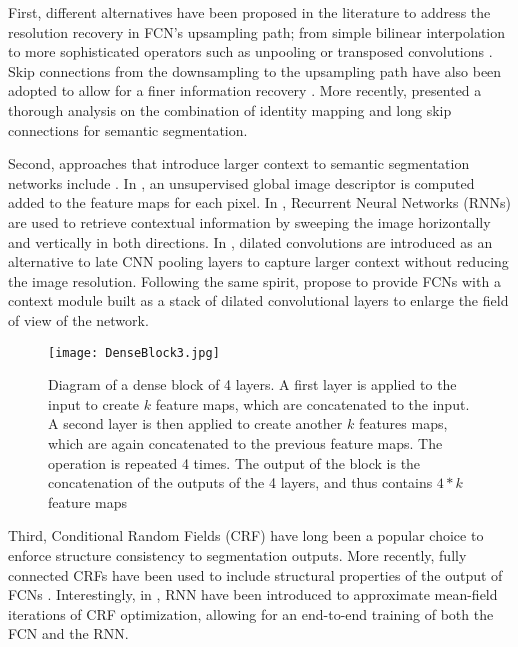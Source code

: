 \documentclass[10pt,twocolumn,letterpaper]{article}
\begin{document}
First, different alternatives have been proposed in the literature to address the resolution recovery in FCN's upsampling path; from simple bilinear interpolation \cite{Gatta14-deepvision, long2015fully, SegNet2015} to more sophisticated operators such as unpooling \cite{SegNet2015, noh2015learning} or transposed convolutions \cite{long2015fully}. Skip connections from the downsampling to the upsampling path have also been adopted to allow for a finer information recovery \cite{ronneberger2015u}. More recently, \cite{DrozdzalVCKP16} presented a thorough analysis on the combination of identity mapping \cite{HeZRS15} and long skip connections \cite{ronneberger2015u} for semantic segmentation.

Second, approaches that introduce larger context to semantic segmentation networks include \cite{Gatta14-deepvision, VisinKCBMC15, chen14semantic, YuKoltun2016}. In \cite{Gatta14-deepvision}, an unsupervised global image descriptor is computed added to the feature maps for each pixel. In \cite{VisinKCBMC15}, Recurrent Neural Networks (RNNs) are used to retrieve contextual information by sweeping the image horizontally and vertically in both directions. In \cite{chen14semantic}, dilated convolutions are introduced as an alternative to late CNN pooling layers to capture larger context without reducing the image resolution. Following the same spirit, \cite{YuKoltun2016} propose to provide FCNs with a context module built as a stack of dilated convolutional layers to enlarge the field of view of the network. 

\begin{figure}[t!]
\centering
  \texttt{[image: DenseBlock3.jpg]}
  \caption{\label{fig:DenseBlock}Diagram of a dense block of 4 layers. A first layer is applied to the input to create $k$ feature maps, which are concatenated to the input. A second layer is then applied to create another $k$ features maps, which are again concatenated to the previous feature maps. The operation is repeated 4 times. The output of the block is the concatenation of the outputs of the 4 layers, and thus contains $4*k$ feature maps}
\end{figure}

Third, Conditional Random Fields (CRF) have long been a popular choice to enforce structure consistency to segmentation outputs. More recently, fully connected CRFs \cite{Koltun11} have been used to include structural properties of the output of FCNs \cite{chen14semantic}. Interestingly, in \cite{CRFasRNN}, RNN have been introduced to approximate mean-field iterations of CRF optimization, allowing for an end-to-end training of both the FCN and the RNN.
\end{document}
